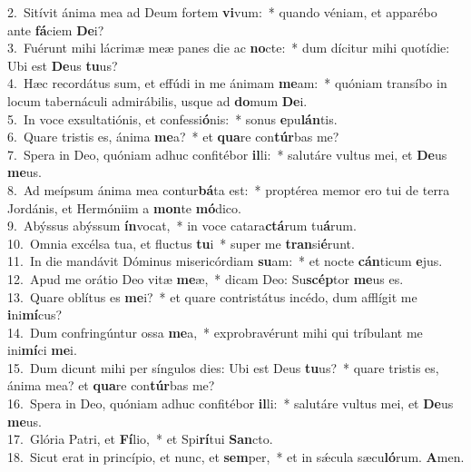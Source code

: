 {2.~}Sitívit ánima mea ad Deum fortem \textbf{vi}vum:~* quando véniam, et apparébo ante \textbf{fá}ciem \textbf{De}i?\\
{3.~}Fuérunt mihi lácrimæ meæ panes die ac \textbf{no}cte:~* dum dícitur mihi quotídie: Ubi est \textbf{De}us \textbf{tu}us?\\
{4.~}Hæc recordátus sum, et effúdi in me ánimam \textbf{me}am:~* quóniam transíbo in locum tabernáculi admirábilis, usque ad \textbf{do}mum \textbf{De}i.\\
{5.~}In voce exsultatiónis, et confessi\textbf{ó}nis:~* sonus \textbf{e}pu\textbf{lán}tis.\\
{6.~}Quare tristis es, ánima \textbf{me}a?~* et \textbf{qua}re con\textbf{túr}bas me?\\
{7.~}Spera in Deo, quóniam adhuc confitébor \textbf{il}li:~* salutáre vultus mei, et \textbf{De}us \textbf{me}us.\\
{8.~}Ad meípsum ánima mea contur\textbf{bá}ta est:~* proptérea memor ero tui de terra Jordánis, et Hermóniim a \textbf{mon}te \textbf{mó}dico.\\
{9.~}Abýssus abýssum \textbf{ín}vocat,~* in voce catara\textbf{ctá}rum tu\textbf{á}rum.\\
{10.~}Omnia excélsa tua, et fluctus \textbf{tu}i~* super me \textbf{tran}si\textbf{é}runt.\\
{11.~}In die mandávit Dóminus misericórdiam \textbf{su}am:~* et nocte \textbf{cán}ticum \textbf{e}jus.\\
{12.~}Apud me orátio Deo vitæ \textbf{me}æ,~* dicam Deo: Su\textbf{scép}tor \textbf{me}us es.\\
{13.~}Quare oblítus es \textbf{me}i?~* et quare contristátus incédo, dum afflígit me \textbf{i}ni\textbf{mí}cus?\\
{14.~}Dum confringúntur ossa \textbf{me}a,~* exprobravérunt mihi qui tríbulant me ini\textbf{mí}ci \textbf{me}i.\\
{15.~}Dum dicunt mihi per síngulos dies: Ubi est Deus \textbf{tu}us?~* quare tristis es, ánima mea? et \textbf{qua}re con\textbf{túr}bas me?\\
{16.~}Spera in Deo, quóniam adhuc confitébor \textbf{il}li:~* salutáre vultus mei, et \textbf{De}us \textbf{me}us.\\
{17.~}Glória Patri, et \textbf{Fí}lio,~* et Spi\textbf{rí}tui \textbf{San}cto.\\
{18.~}Sicut erat in princípio, et nunc, et \textbf{sem}per,~* et in sǽcula sæcu\textbf{ló}rum. \textbf{A}men.\\
